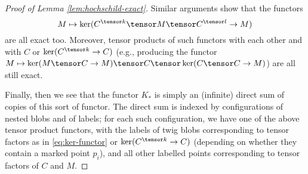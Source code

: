 \begin{proof}[Proof of Lemma \ref{lem:hochschild-exact}]
Similar arguments show that the functors
\begin{equation}
\label{eq:ker-functor}%
M \mapsto \ker(C^{\tensor k} \tensor M \tensor C^{\tensor l} \to M)
\end{equation}
are all exact too. Moreover, tensor products of such functors with each
other and with $C$ or $\ker(C^{\tensor k} \to C)$ (e.g., producing the functor $M \mapsto \ker(M \tensor C \to M)
\tensor C \tensor \ker(C \tensor C \to M)$) are all still exact.

Finally, then we see that the functor $K_*$ is simply an (infinite)
direct sum of copies of this sort of functor. The direct sum is indexed by
configurations of nested blobs and of labels; for each such configuration, we have one of the above tensor product functors,
with the labels of twig blobs corresponding to tensor factors as in \eqref{eq:ker-functor} or $\ker(C^{\tensor k} \to C)$ (depending on whether they contain a marked point $p_i$), and all other labelled points corresponding
to tensor factors of $C$ and $M$.
\end{proof}
